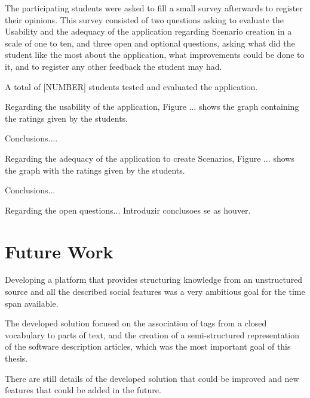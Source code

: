 \documentclass{llncs}
\begin{document}
The participating students were asked to fill a small survey afterwards to register their opinions.
This survey consisted of two questions asking to evaluate the Usability and the adequacy of the application regarding Scenario creation in a scale of one to ten, and three open and optional questions, asking what did the student like the most about the application, what improvements could be done to it, and to register any other feedback the student may had.

A total of [NUMBER] students tested and evaluated the application. 

Regarding the usability of the application, Figure ... shows the graph containing the ratings given by the students.

Conclusions....

Regarding the adequacy of the application to create Scenarios, Figure ... shows the graph with the ratings given by the students.

Conclusions...
\begin{figure}
\centering
{}
\end{figure}

Regarding the open questions... Introduzir conclusoes se as houver.
 

\section{Future Work}
\label{futureWork}
Developing a platform that provides structuring knowledge from an unstructured source and all the described social features was a very ambitious goal for the time span available. 

The developed solution focused on the association of tags from a closed vocabulary to parts of text, and the creation of a semi-structured representation of the software description articles, which was the most important goal of this thesis.

There are still details of the developed solution that could be improved and new features that could be added in the future.
\end{document}
